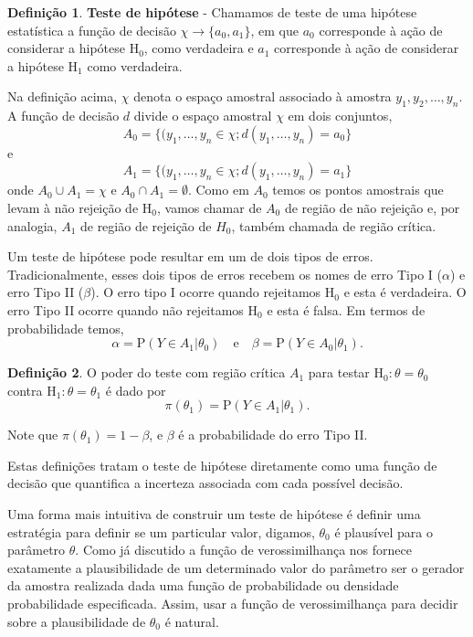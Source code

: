 \documentclass[
  9pt,
  a5paper,
]{book}
\theoremstyle{definition}
\newtheorem{definition}{Definição}[chapter]
\theoremstyle{definition}
\theoremstyle{definition}
\theoremstyle{definition}
\theoremstyle{remark}
\begin{document}
\begin{definition}
\protect\hypertarget{def:unnamed-chunk-17}{}\label{def:unnamed-chunk-17}\textbf{Teste de hipótese} - Chamamos de teste de uma hipótese estatística a função de decisão \(\chi \to \{a_0, a_1\}\), em que \(a_0\) corresponde à ação de considerar a hipótese \(\mathrm{H_0}\), como verdadeira e \(a_1\) corresponde à ação de considerar a hipótese \(\mathrm{H_1}\) como verdadeira.
\end{definition}

Na definição acima, \(\chi\) denota o espaço amostral associado à amostra \(y_1, y_2, \ldots, y_n\). A função de decisão \(d\) divide o espaço amostral \(\chi\) em dois conjuntos,
\[ A_0 = \{ ( y_1, \ldots, y_n \in \chi; d(y_1, \ldots, y_n) = a_0 \}\]
e
\[ A_1 = \{ ( y_1, \ldots, y_n \in \chi; d(y_1, \ldots, y_n) = a_1 \}\]
onde \(A_0 \cup A_1 = \chi\) e \(A_0 \cap A_1 = \emptyset\). Como em \(A_0\) temos os pontos amostrais que levam à não rejeição de \(\mathrm{H_0}\), vamos chamar de \(A_0\) de região de não rejeição e, por analogia, \(A_1\) de região de rejeição de \(H_0\), também chamada de região crítica.

Um teste de hipótese pode resultar em um de dois tipos de erros. Tradicionalmente, esses dois tipos de erros recebem os nomes de erro Tipo I (\(\alpha\)) e erro Tipo II (\(\beta\)).
O erro tipo I ocorre quando rejeitamos \(\mathrm{H_0}\) e esta é verdadeira. O erro Tipo II ocorre quando não rejeitamos \(\mathrm{H_0}\) e esta é falsa. Em termos de probabilidade temos,
\[ \alpha = \mathrm{P}(Y \in A_1 | \theta_0) \quad \text{e} \quad \beta = \mathrm{P}(Y \in A_0 | \theta_1).\]

\begin{definition}
\protect\hypertarget{def:unnamed-chunk-18}{}\label{def:unnamed-chunk-18}O poder do teste com região crítica \(A_1\) para testar \(\mathrm{H_0}: \theta = \theta_0\) contra \(\mathrm{H_1}: \theta = \theta_1\) é dado por
\[\pi(\theta_1) = \mathrm{P}(Y \in A_1 | \theta_1).\]
\end{definition}

Note que \(\pi(\theta_1) = 1 - \beta\), e \(\beta\) é a probabilidade do erro Tipo II.

Estas definições tratam o teste de hipótese diretamente como uma função de decisão
que quantifica a incerteza associada com cada possível decisão.

Uma forma mais intuitiva de construir um teste de hipótese é definir uma estratégia para definir se um particular valor, digamos, \(\theta_0\) é plausível para o parâmetro \(\theta\). Como já discutido a função de verossimilhança nos fornece exatamente a plausibilidade de um determinado valor do parâmetro ser o gerador da amostra realizada dada uma função de probabilidade ou densidade probabilidade especificada. Assim, usar a função de verossimilhança para decidir sobre a plausibilidade de \(\theta_0\) é natural.
\end{document}
